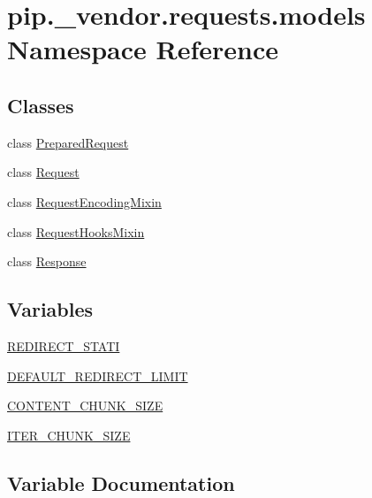 \hypertarget{namespacepip_1_1__vendor_1_1requests_1_1models}{}\section{pip.\+\_\+vendor.\+requests.\+models Namespace Reference}
\label{namespacepip_1_1__vendor_1_1requests_1_1models}
\subsection*{Classes}
\begin{DoxyCompactItemize}
\item 
class \hyperlink{classpip_1_1__vendor_1_1requests_1_1models_1_1PreparedRequest}{Prepared\+Request}
\item 
class \hyperlink{classpip_1_1__vendor_1_1requests_1_1models_1_1Request}{Request}
\item 
class \hyperlink{classpip_1_1__vendor_1_1requests_1_1models_1_1RequestEncodingMixin}{Request\+Encoding\+Mixin}
\item 
class \hyperlink{classpip_1_1__vendor_1_1requests_1_1models_1_1RequestHooksMixin}{Request\+Hooks\+Mixin}
\item 
class \hyperlink{classpip_1_1__vendor_1_1requests_1_1models_1_1Response}{Response}
\end{DoxyCompactItemize}
\subsection*{Variables}
\begin{DoxyCompactItemize}
\item 
\hyperlink{namespacepip_1_1__vendor_1_1requests_1_1models_ac12d43f5a03042d7c08833d463b09843}{R\+E\+D\+I\+R\+E\+C\+T\+\_\+\+S\+T\+A\+TI}
\item 
\hyperlink{namespacepip_1_1__vendor_1_1requests_1_1models_a9ff251eb5ea39bceb41fc8896747ee2f}{D\+E\+F\+A\+U\+L\+T\+\_\+\+R\+E\+D\+I\+R\+E\+C\+T\+\_\+\+L\+I\+M\+IT}
\item 
\hyperlink{namespacepip_1_1__vendor_1_1requests_1_1models_ac0779e26836053a00343bc85344ecad3}{C\+O\+N\+T\+E\+N\+T\+\_\+\+C\+H\+U\+N\+K\+\_\+\+S\+I\+ZE}
\item 
\hyperlink{namespacepip_1_1__vendor_1_1requests_1_1models_a0842472b82f9b8ca12707acd13dbbe38}{I\+T\+E\+R\+\_\+\+C\+H\+U\+N\+K\+\_\+\+S\+I\+ZE}
\end{DoxyCompactItemize}


\subsection{Variable Documentation}
\mbox{\label{namespacepip_1_1__vendor_1_1requests_1_1models_ac0779e26836053a00343bc85344ecad3}} 

